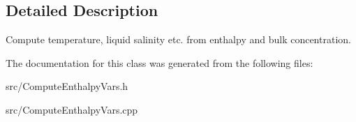 \subsection{Detailed Description}
Compute temperature, liquid salinity etc. from enthalpy and bulk concentration. 

The documentation for this class was generated from the following files\-:\begin{DoxyCompactItemize}
\item 
src/Compute\-Enthalpy\-Vars.\-h\item 
src/Compute\-Enthalpy\-Vars.\-cpp\end{DoxyCompactItemize}
